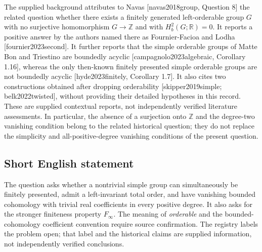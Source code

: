 \documentclass[11pt]{article}
\newcommand{\Z}{\mathbb{Z}}
\newcommand{\R}{\mathbb{R}}
\begin{document}
The supplied background attributes to Navas [navas2018group, Question 8] the related question whether there exists a finitely generated left-orderable group \(G\) with no surjective homomorphism \(G\to\Z\) and with \(H_b^2(G;\R)=0\). It reports a positive answer by the authors named there as Fournier-Facioa and Lodha [fournier2023second]. It further reports that the simple orderable groups of Matte Bon and Triestino are boundedly acyclic [campagnolo2023algebraic, Corollary 1.16], whereas the only then-known finitely presented simple orderable groups are not boundedly acyclic [hyde2023finitely, Corollary 1.7]. It also cites two constructions obtained after dropping orderability [skipper2019simple; belk2022twisted], without providing their detailed hypotheses in this record. These are supplied contextual reports, not independently verified literature assessments. In particular, the absence of a surjection onto \(\Z\) and the degree-two vanishing condition belong to the related historical question; they do not replace the simplicity and all-positive-degree vanishing conditions of the present question.
\subsection{Short English statement}
The question asks whether a nontrivial simple group can simultaneously be finitely presented, admit a left-invariant total order, and have vanishing bounded cohomology with trivial real coefficients in every positive degree. It also asks for the stronger finiteness property \(F_\infty\). The meaning of \emph{orderable} and the bounded-cohomology coefficient convention require source confirmation. The registry labels the problem open; that label and the historical claims are supplied information, not independently verified conclusions.
\end{document}
